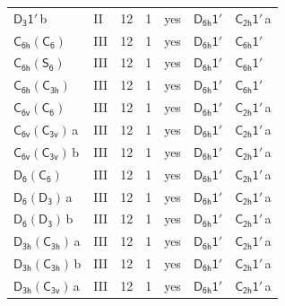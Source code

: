 \documentclass[10pt,a4paper]{article}
\numberwithin{equation}{section}
\newcommand{\grp}[1]{\mathsf{#1}}
\newcommand{\clsletter}[1]{\,{\scriptsize\color{black!55}#1}}
\begin{document}
{\begin{longtable}{@{}llrrlll@{}}
\href{D3-1p.pdf}{$\grp{D_{3}1'}$}\clsletter{b} & II & 12 & 1 & yes & \href{D6h-1p.pdf}{$\grp{D_{6h}1'}$} & \href{C2h-1p.pdf}{$\grp{C_{2h}1'}$}\clsletter{a}\\
\href{C6h-C6.pdf}{$\grp{C_{6h}}(\grp{C_{6}})$} & III & 12 & 1 & yes & \href{D6h-1p.pdf}{$\grp{D_{6h}1'}$} & \href{C6h-1p.pdf}{$\grp{C_{6h}1'}$}\\
\href{C6h-S6.pdf}{$\grp{C_{6h}}(\grp{S_{6}})$} & III & 12 & 1 & yes & \href{D6h-1p.pdf}{$\grp{D_{6h}1'}$} & \href{C6h-1p.pdf}{$\grp{C_{6h}1'}$}\\
\href{C6h-C3h.pdf}{$\grp{C_{6h}}(\grp{C_{3h}})$} & III & 12 & 1 & yes & \href{D6h-1p.pdf}{$\grp{D_{6h}1'}$} & \href{C6h-1p.pdf}{$\grp{C_{6h}1'}$}\\
\href{C6v-C6.pdf}{$\grp{C_{6v}}(\grp{C_{6}})$} & III & 12 & 1 & yes & \href{D6h-1p.pdf}{$\grp{D_{6h}1'}$} & \href{C2h-1p.pdf}{$\grp{C_{2h}1'}$}\clsletter{a}\\
\href{C6v-C3v.pdf}{$\grp{C_{6v}}(\grp{C_{3v}})$}\clsletter{a} & III & 12 & 1 & yes & \href{D6h-1p.pdf}{$\grp{D_{6h}1'}$} & \href{C2h-1p.pdf}{$\grp{C_{2h}1'}$}\clsletter{a}\\
\href{C6v-C3v.pdf}{$\grp{C_{6v}}(\grp{C_{3v}})$}\clsletter{b} & III & 12 & 1 & yes & \href{D6h-1p.pdf}{$\grp{D_{6h}1'}$} & \href{C2h-1p.pdf}{$\grp{C_{2h}1'}$}\clsletter{a}\\
\href{D6-C6.pdf}{$\grp{D_{6}}(\grp{C_{6}})$} & III & 12 & 1 & yes & \href{D6h-1p.pdf}{$\grp{D_{6h}1'}$} & \href{C2h-1p.pdf}{$\grp{C_{2h}1'}$}\clsletter{a}\\
\href{D6-D3.pdf}{$\grp{D_{6}}(\grp{D_{3}})$}\clsletter{a} & III & 12 & 1 & yes & \href{D6h-1p.pdf}{$\grp{D_{6h}1'}$} & \href{C2h-1p.pdf}{$\grp{C_{2h}1'}$}\clsletter{a}\\
\href{D6-D3.pdf}{$\grp{D_{6}}(\grp{D_{3}})$}\clsletter{b} & III & 12 & 1 & yes & \href{D6h-1p.pdf}{$\grp{D_{6h}1'}$} & \href{C2h-1p.pdf}{$\grp{C_{2h}1'}$}\clsletter{a}\\
\href{D3h-C3h.pdf}{$\grp{D_{3h}}(\grp{C_{3h}})$}\clsletter{a} & III & 12 & 1 & yes & \href{D6h-1p.pdf}{$\grp{D_{6h}1'}$} & \href{C2h-1p.pdf}{$\grp{C_{2h}1'}$}\clsletter{a}\\
\href{D3h-C3h.pdf}{$\grp{D_{3h}}(\grp{C_{3h}})$}\clsletter{b} & III & 12 & 1 & yes & \href{D6h-1p.pdf}{$\grp{D_{6h}1'}$} & \href{C2h-1p.pdf}{$\grp{C_{2h}1'}$}\clsletter{a}\\
\href{D3h-C3v.pdf}{$\grp{D_{3h}}(\grp{C_{3v}})$}\clsletter{a} & III & 12 & 1 & yes & \href{D6h-1p.pdf}{$\grp{D_{6h}1'}$} & \href{C2h-1p.pdf}{$\grp{C_{2h}1'}$}\clsletter{a}\\

\end{longtable}}
\end{document}
